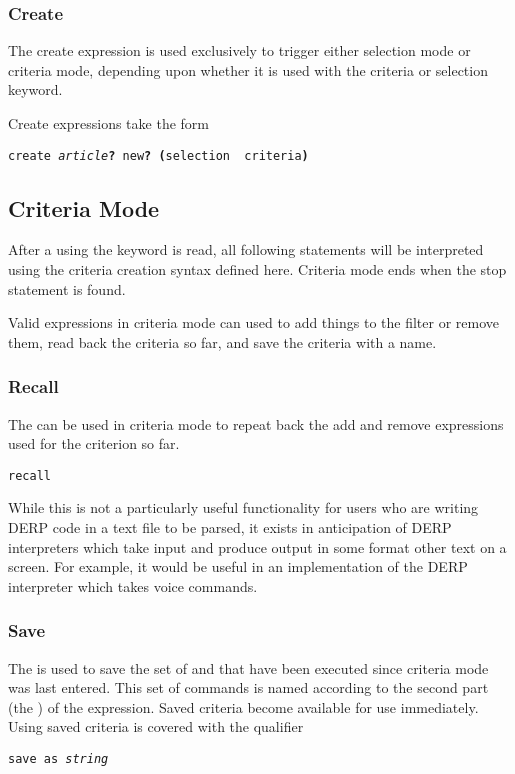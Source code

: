 \subsubsection{Create}
The create expression is used exclusively to trigger either selection mode or criteria mode, depending upon
whether it is used with the criteria or selection keyword.

Create expressions take the form
\begin{description}[labelindent=1cm,leftmargin=\onelen,labelwidth=1cm]
     \texttt{create \textit{article}\textbf{?} new\textbf{?} \textbf{(}selection \textbf{\textbar} criteria\textbf{)}}\\
\end{description}

\subsection{Criteria Mode}
After a  using the keyword  is read, all following statements will be interpreted using
the criteria creation syntax defined here. Criteria mode ends when the stop statement is found.

Valid expressions in criteria mode can used to add things to the filter or remove them, read back the criteria so
far, and save the criteria with a name.

\subsubsection{Recall}
The  can be used in criteria mode to repeat back the add and remove expressions used for the
criterion so far.
\begin{description}[labelindent=1cm,leftmargin=\onelen,labelwidth=1cm]
      \texttt{recall}\\
\end{description}
While this is not a particularly useful functionality for users who are writing DERP code in a text file to be
parsed, it exists in anticipation of DERP interpreters which take input and produce output in some format other
text on a screen. For example, it would be useful in an implementation of the DERP interpreter which takes voice
commands.


\subsubsection{Save}
The  is used to save the set of  and  that have been executed since
criteria mode was last entered. This set of commands is named according to the second part (the ) of the
expression. Saved criteria become available for use immediately. Using saved criteria is covered with the  qualifier
\begin{description}[labelindent=1cm,leftmargin=\onelen,labelwidth=1cm]
     \texttt{save as \textit{string}}\\
\end{description}

